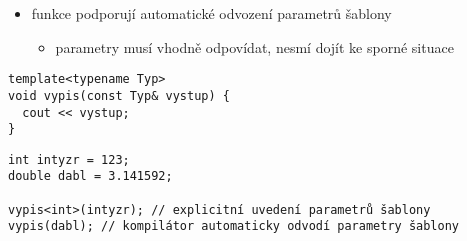\begin{frame}[fragile]
\begin{block}{}
\begin{itemize}
\item funkce podporují automatické odvození parametrů šablony
\begin{itemize}
\item parametry musí vhodně odpovídat, nesmí dojít ke sporné situace
\end{itemize}
\end{itemize}
\end{block}
	
\begin{yesblock}
\begin{lstlisting}
template<typename Typ>
void vypis(const Typ& vystup) {
  cout << vystup;
}
\end{lstlisting}
\end{yesblock}

\begin{yesblock}
\begin{lstlisting}
int intyzr = 123;
double dabl = 3.141592;

vypis<int>(intyzr); // explicitní uvedení parametrů šablony
vypis(dabl); // kompilátor automaticky odvodí parametry šablony
\end{lstlisting}
\end{yesblock}
\end{frame}







